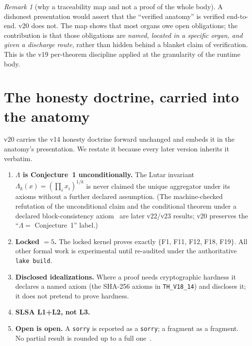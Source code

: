 \documentclass[11pt]{article}
\theoremstyle{plain}
\theoremstyle{definition}
\theoremstyle{remark}
\newtheorem{remark}[theorem]{Remark}
\newcommand{\La}{\Lambda}
\begin{document}
\begin{remark}[why a traceability map and not a proof of the whole body]
A dishonest presentation would assert that the ``verified anatomy'' is verified
end-to-end. v20 does not. The map shows that most organs owe open obligations; the
contribution is that those obligations are \emph{named, located in a specific organ, and
given a discharge route}, rather than hidden behind a blanket claim of verification. This
is the v19 per-theorem discipline applied at the granularity of the runtime body.
\end{remark}

\section{The honesty doctrine, carried into the anatomy}
\label{sec:doctrine}

v20 carries the v14 honesty doctrine forward unchanged and embeds it in the anatomy's
presentation. We restate it because every later version inherits it verbatim.

\begin{enumerate}[leftmargin=1.4em]
\item \textbf{$\La$ is Conjecture~1 unconditionally.} The Lutar invariant
$\La_k(x)=(\prod_i x_i)^{1/k}$ is never claimed the unique aggregator under its axioms
without a further declared assumption. (The machine-checked refutation of the
unconditional claim and the conditional theorem under a declared block-consistency
axiom~\cite{csato2018,aczel1948} are later v22/v23 results; v20 preserves the
``$\La =$ Conjecture~1'' label.)
\item \textbf{Locked $=5$.} The locked kernel proves exactly $\{$F1, F11, F12, F18,
F19$\}$. All other formal work is experimental until re-audited under the authoritative
\texttt{lake build}.
\item \textbf{Disclosed idealizations.} Where a proof needs cryptographic hardness it
declares a named axiom (the SHA-256 axioms in \texttt{TH\_V18\_14}) and discloses it; it
does not pretend to prove hardness.
\item \textbf{SLSA L1+L2, not L3.}~\cite{slsa}
\item \textbf{Open is open.} A \texttt{sorry} is reported as a \texttt{sorry}; a fragment
as a fragment. No partial result is rounded up to a full one~\cite{lakatos1976}.
\end{enumerate}
\end{document}
